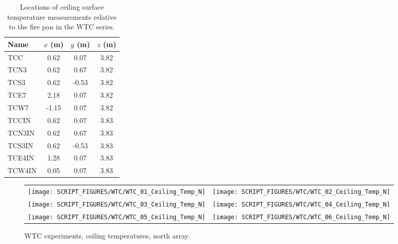 \begin{table}[h!]
\caption[Ceiling surface measurement locations for the WTC series]{Locations of ceiling surface temperature measurements relative to the fire pan in the WTC series.}
\begin{center}
\begin{tabular}{|l|c|c|c|}
\hline
Name                & $x$ (m)   & $y$ (m)   & $z$ (m)   \\ \hline \hline
TCC                 & 0.62      & 0.07      & 3.82      \\ \hline
TCN3                & 0.62      & 0.67      & 3.82      \\ \hline
TCS3                & 0.62      & -0.53     & 3.82      \\ \hline
TCE7                & 2.18      & 0.07      & 3.82      \\ \hline
TCW7                & -1.15     & 0.07      & 3.82      \\ \hline \hline
TCCIN               & 0.62      & 0.07      & 3.83      \\ \hline
TCN3IN              & 0.62      & 0.67      & 3.83      \\ \hline
TCS3IN              & 0.62      & -0.53     & 3.83      \\ \hline
TCE4IN              & 1.28      & 0.07      & 3.83      \\ \hline
TCW4IN              & 0.05      & 0.07      & 3.83      \\ \hline
\end{tabular}
\end{center}
\label{WTC_Ceiling}
\end{table}

\newpage

\begin{figure}[p]
\begin{tabular*}{\textwidth}{l@{\extracolsep{\fill}}r}
\texttt{[image: SCRIPT\_FIGURES/WTC/WTC\_01\_Ceiling\_Temp\_N]} &
\texttt{[image: SCRIPT\_FIGURES/WTC/WTC\_02\_Ceiling\_Temp\_N]} \\
\texttt{[image: SCRIPT\_FIGURES/WTC/WTC\_03\_Ceiling\_Temp\_N]} &
\texttt{[image: SCRIPT\_FIGURES/WTC/WTC\_04\_Ceiling\_Temp\_N]} \\
\texttt{[image: SCRIPT\_FIGURES/WTC/WTC\_05\_Ceiling\_Temp\_N]} &
\texttt{[image: SCRIPT\_FIGURES/WTC/WTC\_06\_Ceiling\_Temp\_N]}
\end{tabular*}
\caption[WTC experiments, ceiling temperatures, north array]{WTC experiments, ceiling temperatures, north array.}
\label{NIST_WTC_Ceiling_N}
\end{figure}


